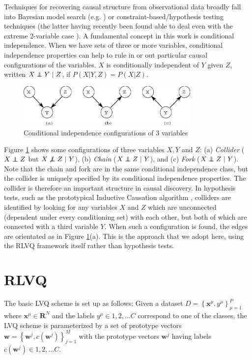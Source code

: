\documentclass{esannV2}
\newcommand\independent{\protect\mathpalette{\protect\independenT}{\perp}}
\def\independenT#1#2{\mathrel{\rlap{$#1#2$}\mkern2mu{#1#2}}}
\def\ci{\independent}
\def\dep{\not\independent}
\begin{document}
Techniques for recovering causal structure from observational data broadly fall into Bayesian model search (e.g. \cite{chickering03}) or constraint-based/hypothesis testing techniques \cite{06} (the latter having recently been found able to deal even with the extreme 2-variable case \cite{peters10}). A fundamental concept in this work is conditional independence. When we have sets of three or more variables, conditional independence properties can help to rule in or out particular causal configurations of the variables. $X$ is conditionally independent of $Y$ given $Z$, written $X \ci Y\ |\ Z$, if $P(X|Y,Z) = P(X|Z)$. 

\begin{figure}
	\centering
		\includegraphics[width=0.80\textwidth]{vstructure.eps}
	\caption{Conditional independence configurations of 3 variables}
	\label{fig:vstructure}
\end{figure}

Figure \ref{fig:vstructure} shows some configurations of three variables $X,Y$ and $Z$: (a) \emph{Collider} ($X \ci Z$ but $X \dep Z\ |\ Y$), (b) \emph{Chain} ($X \ci Z\ |\ Y$), and (c) \emph{Fork} ($X \ci Z\ |\ Y$). Note that the chain and fork are in the same conditional independence class, but the collider is uniquely specified by its conditional independence properties. The collider is therefore an important structure in causal discovery. In hypothesis tests, such as the prototypical Inductive Causation algorithm \cite[\S 2.5]{06}, colliders are identified by looking for any variables $X$ and $Z$ which are unconnected (dependent under every conditioning set) with each other, but both of which are connected with a third variable $Y$. When such a configuration is found, the edges are orientated as in Figure \ref{fig:vstructure}(a). This is the approach that we adopt here, using the RLVQ framework itself rather than hypothesis tests.

\section{RLVQ}
\label{sec:RLVQ}

The basic LVQ scheme is set up as follows; Given a dataset $D = \left\{\textbf{x}^\mu, y^\mu\right\}^P_{\mu = 1}$ where $\textbf{x}^\mu \in \textbf{R}^N$ and the labels $y^\mu \in {1,2,\ldots C}$ correspond to one of the classes, the LVQ scheme is parameterized by a set of prototype vectors $\textbf{w} = \left\{\textbf{w}^j, c(\textbf{w}^j)\right\}^M_{j=1}$ with the prototype vectors $\textbf{w}^j$ having labels $c(\textbf{w}^j) \in {1,2,\dots C}$.
\end{document}
